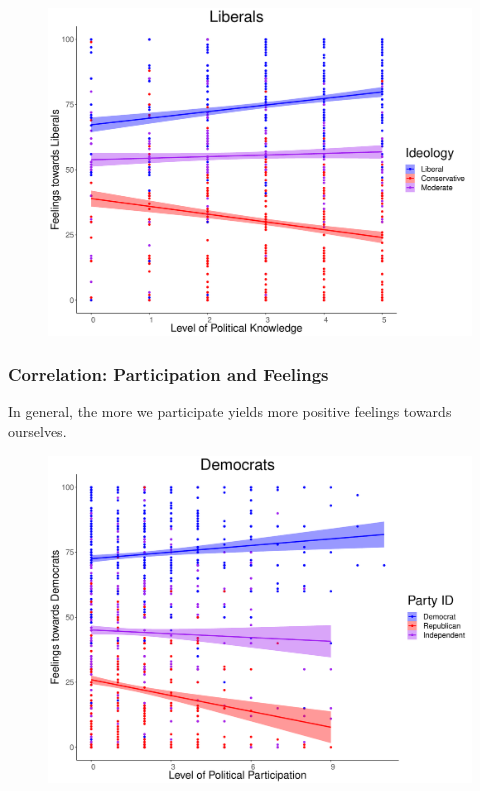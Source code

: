 \documentclass[14pt]{beamer}
\begin{document}
\begin{frame}
\begin{center}
	\begin{figure}[ht!]  
		{	 \includegraphics[width=.9\textwidth]{KFLib}}
	\end{figure}
\end{center}
\end{frame}

\begin{frame}
\frametitle{Correlation: Participation and Feelings}
\begin{center}
	In general, the more we participate yields more positive feelings towards ourselves.
\end{center}
\end{frame}


\begin{frame}
\begin{center}
	\begin{figure}[ht!]  
		{	 \includegraphics[width=.9\textwidth]{PFDem}}
	\end{figure}
\end{center}
\end{frame}
\end{document}
